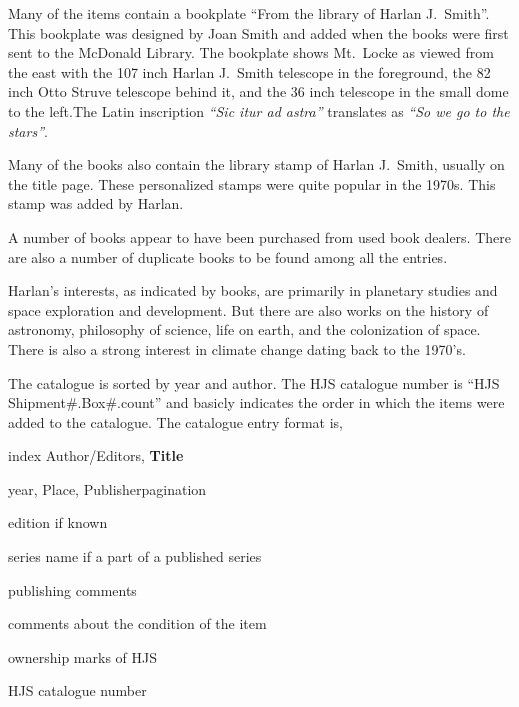Many of the items contain a bookplate ``From the library of Harlan
J.~Smith''.  This bookplate was designed by Joan Smith and added when
the books were first sent to the McDonald Library. The bookplate shows
Mt.~Locke as viewed from the east with the 107 inch Harlan J.~Smith
telescope in the foreground, the 82 inch Otto Struve telescope behind
it, and the 36 inch telescope in the small dome to the left.The Latin
inscription \textit{``Sic itur ad astra''} translates as \textit{``So
we go to the stars''}.

Many of the books also contain the library stamp of Harlan J.~Smith,
usually on the title page. These personalized stamps were quite
popular in the 1970s. This stamp was added by Harlan.

A number of books appear to have been purchased from used book dealers.
There are also a number of duplicate books to be found among all the
entries.

Harlan's interests, as indicated by books, are primarily in planetary
studies and space exploration and development. But there are also works on
the history of astronomy, philosophy of science, life on earth, and the
colonization of space. There is also a strong interest in climate
change dating back to the 1970's.

The catalogue is sorted by year and author. The HJS catalogue number
is ``HJS Shipment\#.Box\#.count'' and basicly indicates the order in
which the items were added to the catalogue. The catalogue entry
format is,
\newline

\footnotesize{index} Author/Editors, \textbf{Title}

year, Place, Publisher\hspace{1em}pagination

edition if known

series name if a part of a published series

publishing comments

comments about the condition of the item

ownership marks of HJS

HJS catalogue number



